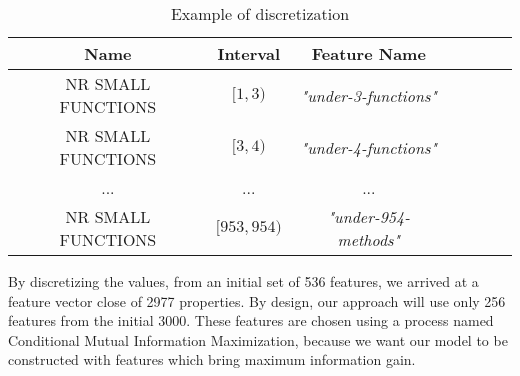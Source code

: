 \begin{table}[ht]
    \centering
    \begin{tabular}{| c | c | c | c | c | c | c | }
    \hline
    Name & Interval & Feature Name\\ \hline
    NR SMALL FUNCTIONS & $[1, 3)$ & \textit{"under-3-functions"}  \\ \hline
    NR SMALL FUNCTIONS & $[3, 4)$ & \textit{"under-4-functions"}  \\ \hline
    ... & ... & ... \\ \hline   
    NR SMALL FUNCTIONS & $[953, 954) $ & \textit{"under-954-methods"}  \\ \hline
    \end{tabular}
    \caption{Example of discretization} 
    \label{tab:discretizationeg}
\end{table}
\par
By discretizing the values, from an initial set of 536 features, we arrived at a feature vector close of 2977 properties. By design, our approach will use only 256 features from the initial 3000. These features are chosen using a process named Conditional Mutual Information Maximization, because we want our model to be constructed with features which bring maximum information gain.